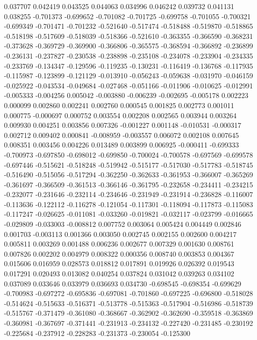 0.037707
0.042419
0.043525
0.044063
0.034996
0.046242
0.039732
0.041131
0.038255
-0.701373
-0.699652
-0.701082
-0.701725
-0.699758
-0.701055
-0.700321
-0.699349
-0.701471
-0.701232
-0.521640
-0.517474
-0.518488
-0.519870
-0.518865
-0.518198
-0.517609
-0.518039
-0.518366
-0.521610
-0.363355
-0.366590
-0.368231
-0.373628
-0.369729
-0.369900
-0.366806
-0.365575
-0.368594
-0.366892
-0.236899
-0.236131
-0.237827
-0.230538
-0.238898
-0.235108
-0.234078
-0.233904
-0.234335
-0.233769
-0.134347
-0.129596
-0.119235
-0.130231
-0.116419
-0.136768
-0.117935
-0.115987
-0.123899
-0.121129
-0.013910
-0.056243
-0.059638
-0.031970
-0.046159
-0.025922
-0.043534
-0.049684
-0.027468
-0.051166
-0.011906
-0.010625
-0.012991
-0.005333
-0.004256
0.005042
-0.003880
-0.006239
-0.002695
-0.005178
0.002223
0.000099
0.002860
0.002241
0.002760
0.000545
0.001825
0.002773
0.001011
0.000775
-0.000697
0.000752
0.003554
0.002208
0.002565
0.003944
0.003264
0.009930
0.004251
0.003856
0.007326
-0.001227
0.001148
-0.010531
-0.000317
0.002712
0.009402
0.000841
-0.008959
-0.003557
0.006072
0.002108
0.007645
0.008351
0.003456
0.004226
0.013489
0.003899
0.006925
-0.000411
-0.699333
-0.700973
-0.697850
-0.698012
-0.699850
-0.700024
-0.700578
-0.697569
-0.699578
-0.697446
-0.515621
-0.518248
-0.519942
-0.515177
-0.517030
-0.517783
-0.518745
-0.516490
-0.515056
-0.517294
-0.362250
-0.362633
-0.361953
-0.366007
-0.365269
-0.361697
-0.366509
-0.361513
-0.366146
-0.361795
-0.232658
-0.234411
-0.234215
-0.232077
-0.231646
-0.232114
-0.234646
-0.231949
-0.231914
-0.236828
-0.116007
-0.113636
-0.122112
-0.116278
-0.121054
-0.117301
-0.118094
-0.117873
-0.115083
-0.117247
-0.026625
-0.011081
-0.033260
-0.019821
-0.032117
-0.023799
-0.016665
-0.029809
-0.033003
-0.008812
0.007752
0.003064
0.005424
0.004449
0.002846
0.001703
-0.003113
0.001366
0.003050
0.002745
0.002155
0.002600
0.004217
0.005811
0.003269
0.001488
0.006236
0.002677
0.007329
0.001630
0.008761
0.007826
0.002202
0.004979
0.008322
0.000356
0.008740
0.003853
0.004367
0.015606
0.016959
0.028573
0.018812
0.017891
0.019926
0.026392
0.019543
0.017291
0.020493
0.013082
0.040254
0.037824
0.031042
0.039263
0.034102
0.037089
0.033646
0.033979
0.036693
0.034730
-0.698545
-0.698354
-0.699629
-0.700983
-0.697272
-0.695836
-0.697081
-0.701860
-0.697225
-0.696800
-0.518028
-0.514624
-0.515633
-0.516371
-0.513778
-0.515363
-0.517904
-0.516986
-0.518739
-0.515767
-0.371479
-0.361080
-0.368667
-0.362902
-0.362690
-0.359518
-0.363869
-0.360981
-0.367697
-0.371441
-0.231913
-0.234132
-0.227420
-0.231485
-0.230192
-0.225684
-0.237912
-0.228283
-0.231373
-0.230054
-0.125300
